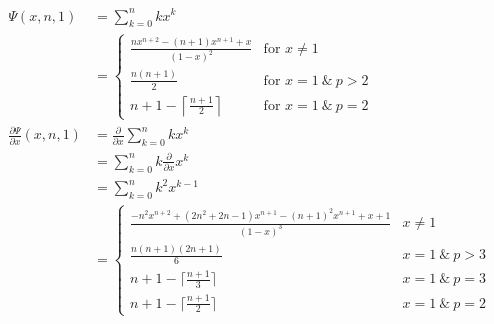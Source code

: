 \documentclass[]{article}
\begin{document}
\begin{align*}
	\Psi(x,n,1)&= \sum_{k=0}^n k x^k \\
	&= \begin{cases}
		\frac{nx^{n+2}-(n+1)x^{n+1}+x}{(1-x)^2}&  \text{for } x\neq 1 \\
		\frac{n(n+1)}{2} & \text{for } x=1 \ \& \ p>2 \\
		n+1-\left\lceil \frac{n+1}{2}\right\rceil & \text{for } x=1 \ \& \ p=2
			\end{cases} \\
	\frac{\partial\Psi}{\partial x}(x,n,1)&=\frac{\partial }{\partial x} \sum_{k=0}^n k x^k\\
	&=\sum_{k=0}^n k \frac{\partial }{\partial x} x^k \\
	&= \sum_{k=0}^n k^2x^{k-1}\\
	&=\begin{cases}
		\frac{-n^2x^{n+2}+(2n^2+2n-1)x^{n+1}-(n+1)^2x^{n+1}+x+1}{(1-x)^3} &x\neq 1\\
		\frac{n(n+1)(2n+1)}{6} & x=1 \ \& \ p>3\\
		n+1-\lceil \frac{n+1}{3} \rceil & x=1 \ \& \ p=3 \\
		n+1-\lceil \frac{n+1}{2} \rceil & x=1 \ \& \ p=2
	\end{cases}
\end{align*}
\pagebreak
\end{document}
